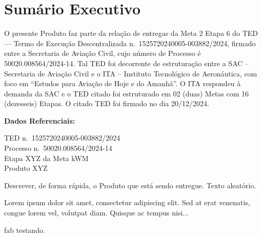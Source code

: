 \chapter*{Sumário Executivo}

O presente Produto faz parte da relação de entregas da Meta 2 Etapa 6 do TED --- Termo de Execução Descentralizada n.\ 1525720240005-003882/2024, firmado entre a Secretaria de Aviação Civil, cujo número de Processo é 50020.008564/2024-14. Tal TED foi decorrente de estruturação entre a SAC -- Secretaria de Aviação Civil e o ITA -- Instituto Tecnológico de Aeronáutica, com foco em ``Estudos para Aviação de Hoje e do Amanhã''. O ITA respondeu à demanda da SAC e o TED citado foi estruturado em 02 (duas) Metas com 16 (dezesseis) Etapas. O citado TED foi firmado no dia 20/12/2024.

\bigskip


\textbf{Dados Referenciais:}
\begin{center}
	\begin{minipage}{0.6\textwidth}
		\raggedright
		TED n.\ 1525720240005-003882/2024\\
		Processo n.\ 50020.008564/2024-14\\
		Etapa XYZ da Meta kWM\\
		Produto XYZ\\
	\end{minipage}
\end{center}

\bigskip

Descrever, de forma rápida, o Produto que está sendo entregue. Texto aleatório.

\smallskip

Lorem ipsum dolor sit amet, consectetur adipiscing elit. Sed at erat venenatis, congue lorem vel, volutpat diam. Quisque ac tempus nisi...


\gls{fab} testando.